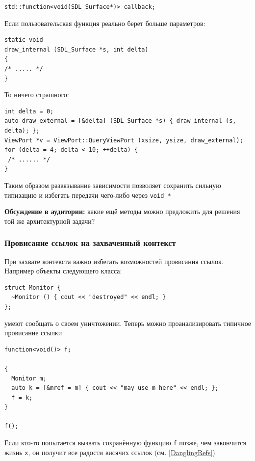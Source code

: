\documentclass[a4paper,12pt,oneside]{article}
\begin{document}
\begin{lstlisting}
std::function<void(SDL_Surface*)> callback;
\end{lstlisting}

Если пользовательская функция реально берет больше параметров:

\begin{lstlisting}
static void
draw_internal (SDL_Surface *s, int delta)
{
/* ..... */
}
\end{lstlisting}

То ничего страшного:

\begin{lstlisting}
int delta = 0;
auto draw_external = [&delta] (SDL_Surface *s) { draw_internal (s, delta); };
ViewPort *v = ViewPort::QueryViewPort (xsize, ysize, draw_external);
for (delta = 4; delta < 10; ++delta) {
 /* ...... */
}
\end{lstlisting}

Таким образом развязывание зависимости позволяет сохранить сильную типизацию и избегать передачи чего-либо через \lstinline!void *!

\textbf{Обсуждение в аудитории:} какие ещё методы можно предложить для решения той же архитектурной задачи?

\subsubsection{Провисание ссылок на захваченный контекст}\label{DanglingContext}

При захвате контекста важно избегать возможностей провисания ссылок. Например объекты следующего класса:

\begin{lstlisting}
struct Monitor {
  ~Monitor () { cout << "destroyed" << endl; }
};
\end{lstlisting}

умеют сообщать о своем уничтожении. Теперь можно проанализировать типичное провисание ссылки

\begin{lstlisting}
function<void()> f;

{
  Monitor m;
  auto k = [&mref = m] { cout << "may use m here" << endl; };
  f = k;
} 

f();
\end{lstlisting}

Если кто-то попытается вызвать сохранённую функцию \lstinline!f! позже, чем закончится жизнь \lstinline!x!, он получит все радости висячих ссылок (см. \ref{DanglingRefs}).
\end{document}

